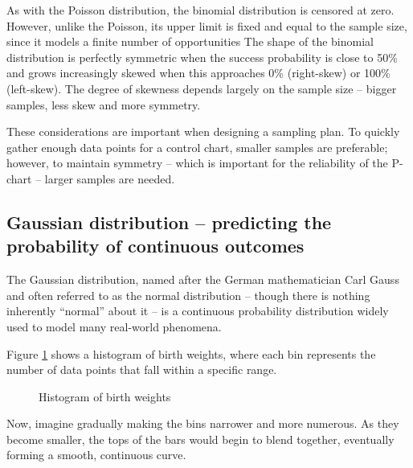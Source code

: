 \documentclass[
]{book}
\makeatletter
\newenvironment{Shaded}{\begin{snugshade}}{\end{snugshade}}
\newcommand{\AttributeTok}[1]{\textcolor[rgb]{0.13,0.29,0.53}{#1}}
\newcommand{\DecValTok}[1]{\textcolor[rgb]{0.00,0.00,0.81}{#1}}
\newcommand{\FunctionTok}[1]{\textcolor[rgb]{0.13,0.29,0.53}{\textbf{#1}}}
\newcommand{\NormalTok}[1]{#1}
\newcommand{\SpecialCharTok}[1]{\textcolor[rgb]{0.81,0.36,0.00}{\textbf{#1}}}
\newcommand*\pandocbounded[1]{%
  \sbox\pandoc@box{#1}%
  \Gscale@div\@tempa{\textheight}{\dimexpr\ht\pandoc@box+\dp\pandoc@box\relax}%
  \Gscale@div\@tempb{\linewidth}{\wd\pandoc@box}%
  \ifdim\@tempb\p@<\@tempa\p@\let\@tempa\@tempb\fi%
  \ifdim\@tempa\p@<\p@\scalebox{\@tempa}{\usebox\pandoc@box}%
  \else\usebox{\pandoc@box}%
  \fi%
}
\makeatother
\begin{document}
As with the Poisson distribution, the binomial distribution is censored at zero. However, unlike the Poisson, its upper limit is fixed and equal to the sample size, since it models a finite number of opportunities The shape of the binomial distribution is perfectly symmetric when the success probability is close to 50\% and grows increasingly skewed when this approaches 0\% (right-skew) or 100\% (left-skew). The degree of skewness depends largely on the sample size -- bigger samples, less skew and more symmetry.

These considerations are important when designing a sampling plan. To quickly gather enough data points for a control chart, smaller samples are preferable; however, to maintain symmetry -- which is important for the reliability of the P-chart -- larger samples are needed.

\subsection{Gaussian distribution -- predicting the probability of continuous outcomes}\label{gaussian-distribution-predicting-the-probability-of-continuous-outcomes}

The Gaussian distribution, named after the German mathematician Carl Gauss and often referred to as the normal distribution -- though there is nothing inherently ``normal'' about it -- is a continuous probability distribution widely used to model many real-world phenomena.

Figure \ref{fig:stat-hist3} shows a histogram of birth weights, where each bin represents the number of data points that fall within a specific range.

\begin{Shaded}
\end{Shaded}

\begin{figure}
\centering
\pandocbounded{}
\caption{\label{fig:stat-hist3}Histogram of birth weights}
\end{figure}

Now, imagine gradually making the bins narrower and more numerous. As they become smaller, the tops of the bars would begin to blend together, eventually forming a smooth, continuous curve.
\end{document}
